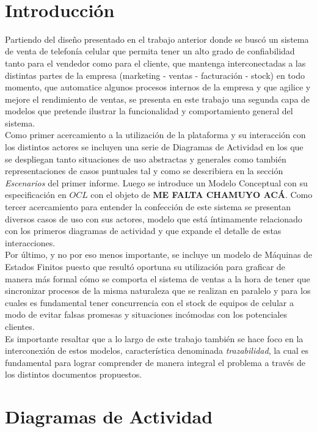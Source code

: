 ‌\section{Introducción}
Partiendo del diseño presentado en el trabajo anterior donde se buscó un sistema de venta de telefonía celular que permita tener un alto grado de confiabilidad tanto para el vendedor como para el cliente, que mantenga interconectadas a las distintas partes de la empresa (marketing - ventas - facturación - stock) en todo momento, que automatice algunos procesos internos de la empresa y que agilice y mejore el rendimiento de ventas, se presenta en este trabajo una segunda capa de modelos que pretende ilustrar la funcionalidad y comportamiento general del sistema.\\
\indent Como primer acercamiento a la utilización de la plataforma y su interacción con los distintos actores se incluyen una serie de Diagramas de Actividad en los que se despliegan tanto situaciones de uso abstractas y generales como también representaciones de casos puntuales tal y como se describiera en la sección \textsl{Escenarios} del primer informe. Luego se introduce un Modelo Conceptual con su especificación en $OCL$ con el objeto de \textbf{ME FALTA CHAMUYO ACÁ}. Como tercer acercamiento para entender la confección de este sistema se presentan diversos casos de uso con sus actores, modelo que está íntimamente relacionado con los primeros diagramas de actividad y que expande el detalle de estas interacciones.\\
\indent Por último, y no por eso menos importante, se incluye un modelo de Máquinas de Estados Finitos puesto que resultó oportuna su utilización para graficar de manera más formal cómo se comporta el sistema de ventas a la hora de tener que sincronizar procesos de la misma naturaleza que se realizan en paralelo y para los cuales es fundamental tener concurrencia con el stock de equipos de celular a modo de evitar falsas promesas y situaciones incómodas con los potenciales clientes.\\
\indent Es importante resaltar que a lo largo de este trabajo también se hace foco en la interconexión de estos modelos, característica denominada \textsl{trazabilidad}, la cual es fundamental para lograr comprender de manera integral el problema a través de los distintos documentos propuestos.\\

\section{Diagramas de Actividad}

